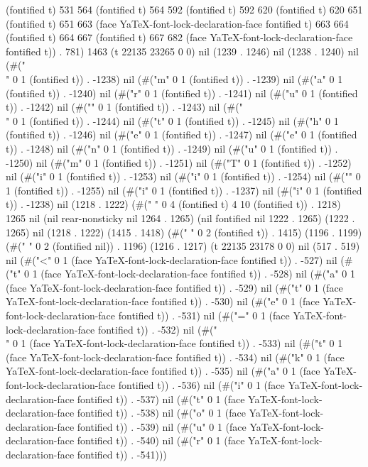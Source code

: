 (fontified t) 531 564 (fontified t) 564 592 (fontified t) 592 620 (fontified t) 620 651 (fontified t) 651 663 (face YaTeX-font-lock-declaration-face fontified t) 663 664 (fontified t) 664 667 (fontified t) 667 682 (face YaTeX-font-lock-declaration-face fontified t)) . 781) 1463 (t 22135 23265 0 0) nil (1239 . 1246) nil (1238 . 1240) nil (#("\\" 0 1 (fontified t)) . -1238) nil (#("m" 0 1 (fontified t)) . -1239) nil (#("a" 0 1 (fontified t)) . -1240) nil (#("r" 0 1 (fontified t)) . -1241) nil (#("u" 0 1 (fontified t)) . -1242) nil (#("{" 0 1 (fontified t)) . -1243) nil (#("\\" 0 1 (fontified t)) . -1244) nil (#("t" 0 1 (fontified t)) . -1245) nil (#("h" 0 1 (fontified t)) . -1246) nil (#("e" 0 1 (fontified t)) . -1247) nil (#("e" 0 1 (fontified t)) . -1248) nil (#("n" 0 1 (fontified t)) . -1249) nil (#("u" 0 1 (fontified t)) . -1250) nil (#("m" 0 1 (fontified t)) . -1251) nil (#("T" 0 1 (fontified t)) . -1252) nil (#("i" 0 1 (fontified t)) . -1253) nil (#("i" 0 1 (fontified t)) . -1254) nil (#("}" 0 1 (fontified t)) . -1255) nil (#("i" 0 1 (fontified t)) . -1237) nil (#("i" 0 1 (fontified t)) . -1238) nil (1218 . 1222) (#("          " 0 4 (fontified t) 4 10 (fontified t)) . 1218) 1265 nil (nil rear-nonsticky nil 1264 . 1265) (nil fontified nil 1222 . 1265) (1222 . 1265) nil (1218 . 1222) (1415 . 1418) (#("  " 0 2 (fontified t)) . 1415) (1196 . 1199) (#("  " 0 2 (fontified nil)) . 1196) (1216 . 1217) (t 22135 23178 0 0) nil (517 . 519) nil (#("<" 0 1 (face YaTeX-font-lock-declaration-face fontified t)) . -527) nil (#("t" 0 1 (face YaTeX-font-lock-declaration-face fontified t)) . -528) nil (#("a" 0 1 (face YaTeX-font-lock-declaration-face fontified t)) . -529) nil (#("t" 0 1 (face YaTeX-font-lock-declaration-face fontified t)) . -530) nil (#("e" 0 1 (face YaTeX-font-lock-declaration-face fontified t)) . -531) nil (#("=" 0 1 (face YaTeX-font-lock-declaration-face fontified t)) . -532) nil (#("\\" 0 1 (face YaTeX-font-lock-declaration-face fontified t)) . -533) nil (#("t" 0 1 (face YaTeX-font-lock-declaration-face fontified t)) . -534) nil (#("k" 0 1 (face YaTeX-font-lock-declaration-face fontified t)) . -535) nil (#("a" 0 1 (face YaTeX-font-lock-declaration-face fontified t)) . -536) nil (#("i" 0 1 (face YaTeX-font-lock-declaration-face fontified t)) . -537) nil (#("t" 0 1 (face YaTeX-font-lock-declaration-face fontified t)) . -538) nil (#("o" 0 1 (face YaTeX-font-lock-declaration-face fontified t)) . -539) nil (#("u" 0 1 (face YaTeX-font-lock-declaration-face fontified t)) . -540) nil (#("r" 0 1 (face YaTeX-font-lock-declaration-face fontified t)) . -541)))

